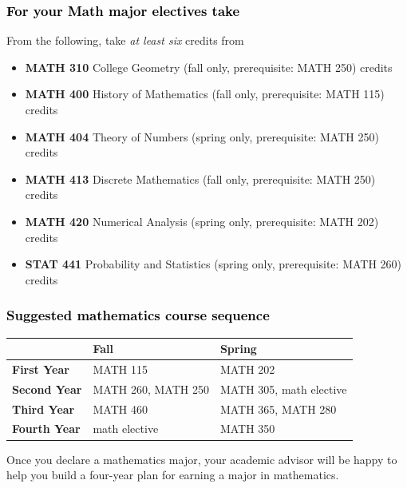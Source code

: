 \documentclass[10pt]{article}
\newcommand{\calconeshort}{MATH 115}
\newcommand{\calctwoshort}{MATH 202}
\newcommand{\foundationsshort}{MATH 250}
\newcommand{\calcthreeshort}{MATH 260}
\newcommand{\linearshort}{MATH 280}
\newcommand{\discrete}{\textbf{MATH 413} Discrete Mathematics  (fall only, prerequisite: MATH 250)\dotfill 3 credits}
\newcommand{\statistics}{\textbf{STAT 441} Probability and Statistics (spring only, prerequisite: MATH 260)  \dotfill  3 credits}
\newcommand{\diffeqshort}{MATH 305}
\newcommand{\abstractalgebrashort}{MATH 350}
\newcommand{\complexshort}{MATH 365}
\newcommand{\advancedcalcshort}{MATH 460}
\newcommand{\numerical}{\textbf{MATH 420}   Numerical Analysis   (spring only, prerequisite: MATH 202)\dotfill 3 credits}
\newcommand{\collegegeometry}{\textbf{MATH 310}	College Geometry (fall only,  prerequisite: MATH 250) \dotfill 3 credits}
\newcommand{\mathhistory}{\textbf{MATH 400} History of Mathematics (fall only,  prerequisite: MATH 115) \dotfill 3 credits}
\newcommand{\numbertheory}{\textbf{MATH 404} Theory of Numbers (spring only,  prerequisite: MATH 250) \dotfill 3 credits}
\newcommand{\mathBS}{
     \begin{center}
         \begin{tabular}[h]{| l | l | l|} 
            \hline
                       & \textbf{Fall}         &  \textbf{Spring}  \\ \hline 
            \textbf{First Year} & \calconeshort{}  & \calctwoshort \\  \hline
            \textbf{Second Year} &  \calcthreeshort{}, \foundationsshort & \diffeqshort, math elective \\ \hline
            \textbf{Third Year} & \advancedcalcshort              &  \complexshort{}, \linearshort \\ \hline
            \textbf{Fourth Year} & math elective &  \abstractalgebrashort  \\ \hline
         \end{tabular}
\end{center}}
\begin{document}
\subsubsection*{\textcolor{black}{For your Math major electives take}}

From the following, take \emph{at least six} credits from
\vspace{0.1in}

\begin{itemize}
\item \collegegeometry
\item \mathhistory
\item \numbertheory
\item \discrete
\item \numerical
\item \statistics
\end{itemize}




\subsubsection*{\textcolor{black}{Suggested mathematics course sequence}}

\mathBS


  \vspace{0.1in}

 \noindent Once you declare a mathematics major, your academic advisor will be happy to help you build a four-year plan for earning a major in mathematics.

   \vspace{0.1in}
\end{document}
